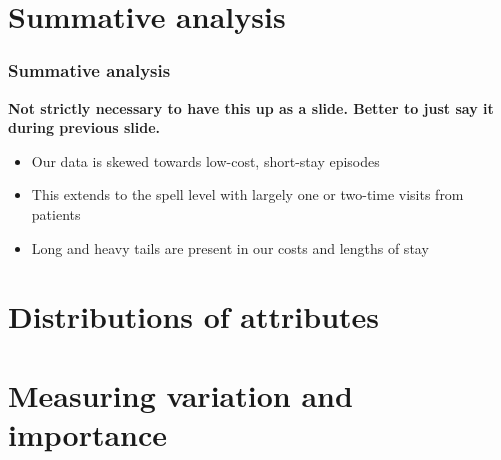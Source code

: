 \section{Summative analysis}

\begin{frame}
    \frametitle{Summative analysis}
    \textbf{Not strictly necessary to have this up as a slide. Better to just
    say it during previous slide.}
    \begin{itemize}
        \pause%
        \item Our data is skewed towards low-cost, short-stay episodes
        \pause%
        \item This extends to the spell level with largely one or two-time
            visits from patients
        \pause%
        \item Long and heavy tails are present in our costs and lengths of stay
    \end{itemize}
\end{frame}

\section{Distributions of attributes}

\section{Measuring variation and importance}

